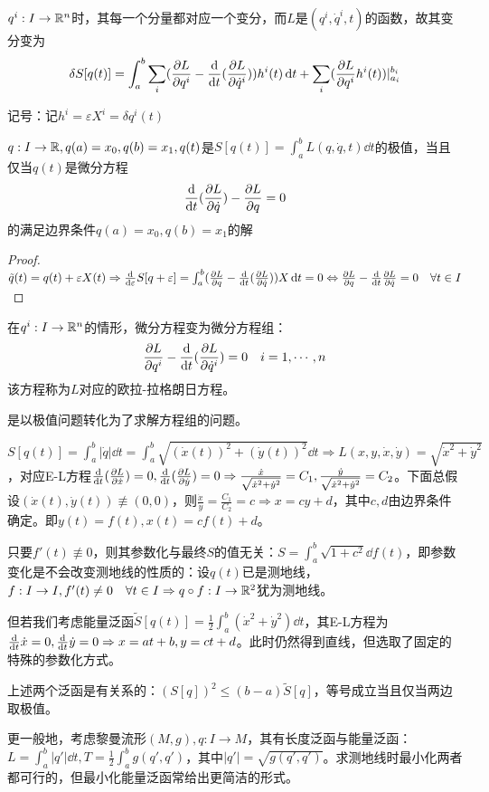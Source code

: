 \documentclass{ctexbook}
\begin{document}
\begin{Rmk}
  $q^{i}:I\to \mathbb{R}^{n}$时，其每一个分量都对应一个变分，而$L$是$(q^{i},\dot q^{i},t)$的函数，故其变分变为
  \[\delta S[q(t)]=\int_{a}^{b}\sum_{i}(\frac{\partial L}{\partial q^{i}}-\frac{\mathrm{d}}{\mathrm{d}t}(\frac{\partial L}{\partial \dot q^{i}}))h^{i}(t)\,\mathrm{d} t+\sum_{i}(\frac{\partial L}{\partial q^{i}}h^{i}(t))|_{a_{i}}^{b_{i}}\]
\end{Rmk}

记号：记$h^{i}=\varepsilon X^{i}=\delta q^{i}(t)$

\begin{Thm}
  $q:I\to\mathbb{R},q(a)=x_{0},q(b)=x_{1},q(t)$是$S[q(t)]=\int_{a}^{b}L(q,\dot q,t)\dd t$的极值，当且仅当$q(t)$是微分方程\[\frac{\mathrm{d}}{\mathrm{d}t}(\frac{\partial L}{\partial \dot q})-\frac{\partial L}{\partial q}=0\]的满足边界条件$q(a)=x_{0},q(b)=x_{1}$的解
\end{Thm}

\begin{proof}
  $\tilde q(t)=q(t)+\varepsilon X(t)\Rightarrow \frac{\mathrm{d}}{\mathrm{d}\varepsilon}S[q+\varepsilon]=\int_{a}^{b}(\frac{\partial L}{\partial q}-\frac{\mathrm{d}}{\mathrm{d}t}(\frac{\partial L}{\partial \dot q}))X\,\mathrm{d} t=0\Leftrightarrow \frac{\partial L}{\partial q}-\frac{\mathrm{d}}{\mathrm{d}t}\frac{\partial L}{\partial \dot q}=0\quad \forall t\in I$
\end{proof}

在$q^{i}:I\to \mathbb{R}^{n}$的情形，微分方程变为微分方程组：
\[\frac{\partial L}{\partial q^{i}}-\frac{\mathrm{d}}{\mathrm{d}t}(\frac{\partial L}{\partial \dot q^{i}})=0\quad i=1,\cdots,n\]
该方程称为$L$对应的欧拉-拉格朗日方程。

是以极值问题转化为了求解方程组的问题。

\begin{Eg}[欧氏空间中两点之间直线最短]
  $S[q(t)]=\int_{a}^{b}|\dot q|\dd t=\int_{a}^{b}\sqrt{(\dot x(t))^{2}+(\dot{y}(t))^{2}}\dd t\Rightarrow L(x,y,\dot x,\dot y)=\sqrt{\dot x^{2}+\dot y^{2}}$，对应E-L方程$\frac{\mathrm{d}}{\mathrm{d}t}(\frac{\partial L}{\partial \dot x})=0,\frac{\mathrm{d}}{\mathrm{d}t}(\frac{\partial L}{\partial \dot y})=0\Rightarrow \frac{\dot{x}}{\sqrt{\dot x^{2}+\dot y^{2}}}=C_{1},\frac{\dot{y}}{\sqrt{\dot x^{2}+\dot y^{2}}}=C_{2}$。下面总假设$(\dot x(t),\dot y(t))\not\equiv (0,0)$，则$\frac{\dot x}{\dot y}=\frac{C_{1}}{C_{2}}=c\Rightarrow x=cy+d$，其中$c,d$由边界条件确定。即$y(t)=f(t),x(t)=cf(t)+d$。

  只要$f'(t)\not\equiv 0$，则其参数化与最终$S$的值无关：$S=\int_{a}^{b}\sqrt{1+c^{2}}\dd f(t)$，即参数变化是不会改变测地线的性质的：设$q(t)$已是测地线，$f:I\to I, f'(t)\neq 0\quad \forall t\in I\Rightarrow q\circ f:I\to \mathbb{R}^{2}$犹为测地线。

  但若我们考虑能量泛函$\tilde S[q(t)]=\frac{1}{2}\int_{a}^{b}(\dot x^{2}+\dot y^{2})\dd t$，其E-L方程为$\frac{\mathrm{d}}{\mathrm{d}t}\dot x=0,\frac{\mathrm{d}}{\mathrm{d}t}\dot y=0\Rightarrow x=at+b,y=ct+d$。此时仍然得到直线，但选取了固定的特殊的参数化方式。

  上述两个泛函是有关系的：$(S[q])^{2}\leq (b-a) \tilde S[q]$，等号成立当且仅当两边取极值。

  更一般地，考虑黎曼流形$(M,g),q:I\to M$，其有长度泛函与能量泛函：$L=\int_{a}^{b}|q'|\dd t, T=\frac{1}{2}\int_{a}^{b}g(q',q')$，其中$|q'|=\sqrt{g(q',q')}$。求测地线时最小化两者都可行的，但最小化能量泛函常给出更简洁的形式。
\end{Eg}
\end{document}
